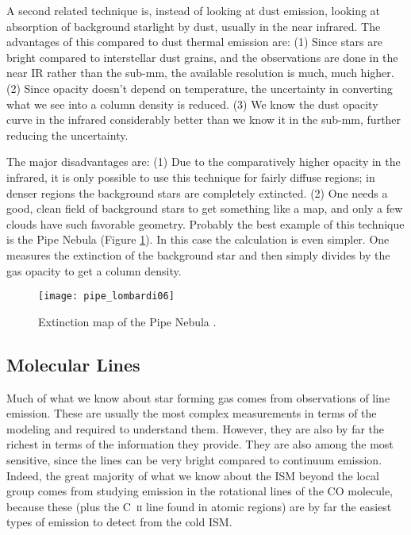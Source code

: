 A second related technique is, instead of looking at dust emission, looking at absorption of background starlight by dust, usually in the near infrared.  The advantages of this compared to dust thermal emission are: (1) Since stars are bright compared to interstellar dust grains, and the observations are done in the near IR rather than the sub-mm, the available resolution is much, much higher.  (2) Since opacity doesn't depend on temperature, the uncertainty in converting what we see into a column density is reduced.  (3) We know the dust opacity curve in the infrared considerably better than we know it in the sub-mm, further reducing the uncertainty.
  
The major disadvantages are: (1) Due to the comparatively higher opacity in the infrared, it is only possible to use this technique for fairly diffuse regions; in denser regions the background stars are completely extincted. (2) One needs a good, clean field of background stars to get something like a map, and only a few clouds have such favorable geometry.
Probably the best example of this technique is the Pipe Nebula (Figure \ref{fig:pipe_lombardi06}).  In this case the calculation is even simpler. One measures the extinction of the background star and then simply divides by the gas opacity to get a column density.

\begin{figure}
\texttt{[image: pipe\_lombardi06]}
\caption[Dust extinction map of the Pipe Nebula]{
\label{fig:pipe_lombardi06}
Extinction map of the Pipe Nebula \citep{lombardi06a}.
}
\end{figure}


\subsection{Molecular Lines}
\label{ssec:molecular_lines}

Much of what we know about star forming gas comes from observations of line emission. These are usually the most complex measurements in terms of the modeling and required to understand them. However, they are also by far the richest in terms of the information they provide. They are also among the most sensitive, since the lines can be very bright compared to continuum emission. Indeed, the great majority of what we know about the ISM beyond the local group comes from studying emission in the rotational lines of the CO molecule, because these (plus the C~\textsc{ii} line found in atomic regions) are by far the easiest types of emission to detect from the cold ISM.

